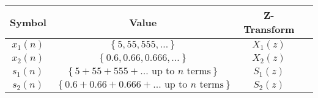 \begin{tabular}{|c|c|c|c|}
    \hline
    \textbf{Symbol} & \textbf{Value} & \textbf{Z-Transform} \\
    \hline
    $x_1(n)$ & $\left\{5, 55, 555, \ldots\right\}$ & $X_1(z)$ \\
    \hline
    $x_2(n)$ & $\left\{0.6, 0.66, 0.666, \ldots\right\}$ & $X_2(z)$ \\
    \hline
    $s_1(n)$ & $\left\{5+55+555+\ldots \text{ up to } n \text{ terms}\right\}$ & $S_1(z)$ \\
    \hline
    $s_2(n)$ & $\left\{0.6+0.66+0.666+\ldots \text{ up to } n \text{ terms}\right\}$ & $S_2(z)$ \\
    \hline
\end{tabular}
